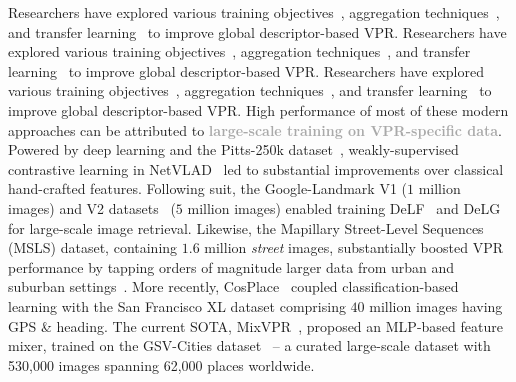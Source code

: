 \documentclass[letterpaper, 10 pt, conference]{ieeeconf}  \fi
\newcommand{\highlight}[1]{\textcolor{darkgray}{\textbf{#1}}}
\begin{document}
\ifarxiv
Researchers have explored various training objectives~\cite{ge2020self,xiao2023visual,leyva2023data,berton2022rethinking}, aggregation techniques~\cite{arandjelovic2016netvlad,radenovic2018fine,chen2021learning}, and transfer learning~\cite{haas2023learning,berton2021adaptive,latif2018addressing} to improve global descriptor-based VPR. 
\fi
\ifral
Researchers have explored various training objectives~\cite{ge2020self,xiao2023visual,leyva2023data,berton2022rethinking}, aggregation techniques~\cite{arandjelovic2016netvlad,radenovic2018fine}, and transfer learning~\cite{haas2023learning,berton2021adaptive,latif2018addressing} to improve global descriptor-based VPR.
\fi
\ifralfinal
Researchers have explored various training objectives~\cite{ge2020self,xiao2023visual,leyva2023data,berton2022rethinking}, aggregation techniques~\cite{arandjelovic2016netvlad,radenovic2018fine}, and transfer learning~\cite{haas2023learning,berton2021adaptive,latif2018addressing} to improve global descriptor-based VPR.
\fi
High performance of most of these modern approaches can be attributed to \highlight{large-scale training on VPR-specific data}.
Powered by deep learning and the Pitts-250k dataset~\cite{torii2013visual}, weakly-supervised contrastive learning in NetVLAD~\cite{arandjelovic2016netvlad} led to substantial improvements over classical hand-crafted features. 
Following suit, the Google-Landmark V1 ($1$ million images) and V2 datasets~\cite{weyand2020google} ($5$ million images) enabled training DeLF~\cite{noh2017large} and DeLG~\cite{cao2020unifying} for large-scale image retrieval.
Likewise, the Mapillary Street-Level Sequences (MSLS) dataset, containing $1.6$ million \textit{street} images, substantially boosted VPR performance by tapping orders of magnitude larger data from urban and suburban settings~\cite{warburg2020mapillary, wang2022transvpr, zhu2023r2former}.
More recently, CosPlace~\cite{berton2022rethinking} 
coupled classification-based learning with the San Francisco XL dataset comprising $40$ million images having GPS \& heading.
The current SOTA, MixVPR~\cite{ali2023mixvpr}, proposed an MLP-based feature mixer, trained
on the GSV-Cities dataset~\cite{ali2022gsv} -- a curated large-scale dataset with 530,000 images spanning 62,000 places worldwide.
\end{document}
